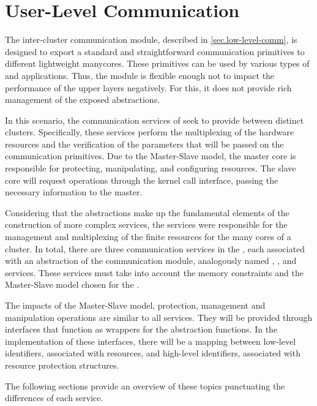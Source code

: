 	\section{User-Level Communication}
	\label{sec.user-level-comm}

		The inter-cluster communication module, described in \autoref{sec.low-level-comm},
		is designed to export a standard and straightforward communication
		primitives to different lightweight manycores.
		These primitives can be used by various types of \oss and applications.
		Thus, the module is flexible enough not to impact the performance
		of the upper layers negatively.
		For this, it does not provide rich management of the exposed abstractions.

		In this scenario, the communication services of \nanvixmicrokernel seek
		to provide \ipc between distinct clusters.
		Specifically, these services perform the multiplexing of the hardware
		resources and the verification of the parameters that will be passed
		on the communication primitives.
		Due to the Master-Slave model, the master core is responsible for protecting,
		manipulating, and configuring \hal resources.
		The slave core will request operations through the kernel call interface,
		passing the necessary information to the master.

		Considering that the abstractions make up the fundamental elements of
		the construction of more complex services, the \nanvixmicrokernel services
		were responsible for the management and multiplexing of the finite
		resources for the many cores of a cluster.
		In total, there are three communication services in the \nanvixmicrokernel,
		each associated with an abstraction of the communication module,
		analogously named \sync, \mailbox, and \portal services.
		These services must take into account the memory constraints and the
		Master-Slave model chosen for the \nanvixmicrokernel.

		The impacts of the Master-Slave model, protection, management and manipulation
		operations are similar to all services.
		They will be provided through interfaces that function as wrappers
		for the \hal abstraction functions.
		In the implementation of these interfaces, there will be a mapping
		between low-level identifiers, associated with \hal resources,
		and high-level identifiers, associated with resource protection structures.

		The following sections provide an overview of these topics punctuating
		the differences of each service.

